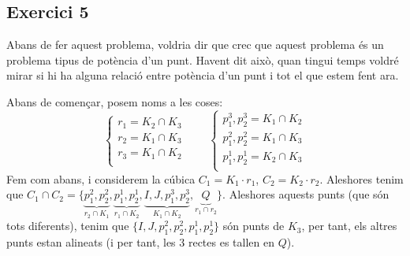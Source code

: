 \documentclass[11pt, a4paper]{article}
\begin{document}
\subsection{Exercici 5}
Abans de fer aquest problema, voldria dir que crec que aquest problema és un problema tipus de potència d'un punt. Havent dit això, quan tingui temps voldré mirar si hi ha alguna relació entre potència d'un punt i tot el que estem fent ara.\par
Abans de començar, posem noms a les coses:
\[
    \begin{cases*}
        r_1=K_2\cap K_3\\
        r_2=K_1\cap K_3\\
        r_3=K_1\cap K_2\\
    \end{cases*}\qquad \begin{cases*}
        p_1^3, p_2^3 = K_1\cap K_2\\
        p_1^2, p_2^2 = K_1\cap K_3\\
        p_1^1, p_2^1 = K_2\cap K_3\\
    \end{cases*}
\]
Fem com abans, i considerem la cúbica $C_1=K_1\cdot r_1$, $C_2 = K_2\cdot r_2$. Aleshores tenim que $C_1\cap C_2=\{\underbrace{p_1^2,p_2^2}_{r_2\cap K_1},\underbrace{p_1^1,p_2^1}_{r_1\cap K_2},\underbrace{I,J,p_1^3,p_2^3}_{K_1\cap K_2}, \underbrace{Q}_{r_1\cap r_2}\}$. Aleshores aquests punts (que són tots diferents), tenim que $\{I,J,p_1^2,p_2^2,p_1^1,p_2^1\}$ són punts de $K_3$, per tant, els altres punts estan alineats (i per tant, les 3 rectes es tallen en $Q$).
\end{document}

